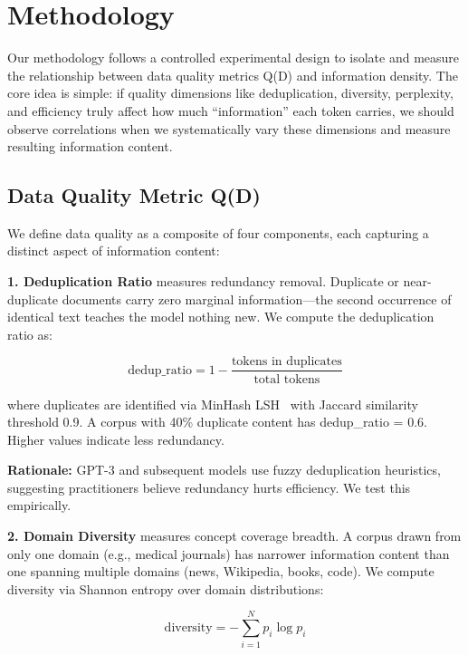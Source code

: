 \section{Methodology}

Our methodology follows a controlled experimental design to isolate and measure the relationship between data quality metrics Q(D) and information density. The core idea is simple: if quality dimensions like deduplication, diversity, perplexity, and efficiency truly affect how much ``information'' each token carries, we should observe correlations when we systematically vary these dimensions and measure resulting information content.

\subsection{Data Quality Metric Q(D)}

We define data quality as a composite of four components, each capturing a distinct aspect of information content:

\textbf{1. Deduplication Ratio} measures redundancy removal. Duplicate or near-duplicate documents carry zero marginal information---the second occurrence of identical text teaches the model nothing new. We compute the deduplication ratio as:

\begin{equation}
\text{dedup\_ratio} = 1 - \frac{\text{tokens in duplicates}}{\text{total tokens}}
\end{equation}

where duplicates are identified via MinHash LSH~\cite{broder1997resemblance} with Jaccard similarity threshold 0.9. A corpus with 40\% duplicate content has dedup\_ratio = 0.6. Higher values indicate less redundancy.

\textbf{Rationale:} GPT-3 and subsequent models use fuzzy deduplication heuristics, suggesting practitioners believe redundancy hurts efficiency. We test this empirically.

\textbf{2. Domain Diversity} measures concept coverage breadth. A corpus drawn from only one domain (e.g., medical journals) has narrower information content than one spanning multiple domains (news, Wikipedia, books, code). We compute diversity via Shannon entropy over domain distributions:

\begin{equation}
\text{diversity} = -\sum_{i=1}^{N} p_i \log p_i
\end{equation}

